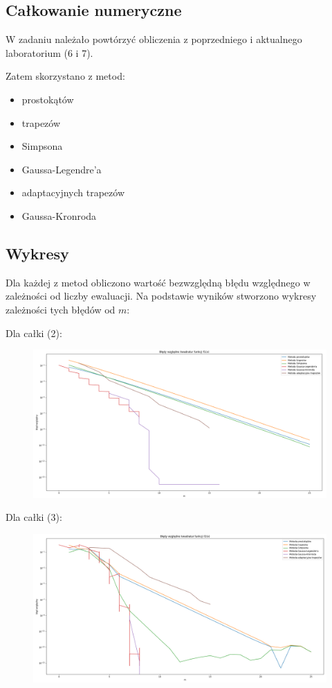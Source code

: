 \documentclass{article}
\begin{document}
	\subsection*{Całkowanie numeryczne}

	W zadaniu należało powtórzyć obliczenia z poprzedniego i aktualnego laboratorium (6 i 7). 

	Zatem skorzystano z metod:
	\begin{itemize}
		\item prostokątów
		\item trapezów
		\item Simpsona
		\item Gaussa-Legendre'a
		\item adaptacyjnych trapezów
		\item Gaussa-Kronroda
	\end{itemize}

	\newpage
	\subsection*{Wykresy}

	Dla każdej z metod obliczono wartość bezwzględną błędu względnego w zależności od liczby ewaluacji. Na podstawie wyników stworzono wykresy zależności tych błędów od $m$:

	Dla całki (2): 
	\begin{figure}[h]
		\centering
		\includegraphics[scale = 0.28]{wykres2.png}
	\end{figure}

	Dla całki (3):

	\begin{figure}[h]
		\centering
		\includegraphics[scale = 0.28]{wykres3.png}
	\end{figure}
	
	
	
	
	
	
	
	
	
	
	
	
\end{document}
